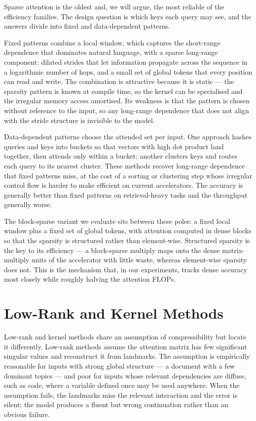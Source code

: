 \documentclass[11pt]{article}
\begin{document}
Sparse attention is the oldest and, we will argue, the most reliable of the efficiency families. The design question is which keys each query may see, and the answers divide into fixed and data-dependent patterns.

Fixed patterns combine a local window, which captures the short-range dependence that dominates natural language, with a sparse long-range component: dilated strides that let information propagate across the sequence in a logarithmic number of hops, and a small set of global tokens that every position can read and write. The combination is attractive because it is static --- the sparsity pattern is known at compile time, so the kernel can be specialised and the irregular memory access amortised. Its weakness is that the pattern is chosen without reference to the input, so any long-range dependence that does not align with the stride structure is invisible to the model.

Data-dependent patterns choose the attended set per input. One approach hashes queries and keys into buckets so that vectors with high dot product land together, then attends only within a bucket; another clusters keys and routes each query to its nearest cluster. These methods recover long-range dependence that fixed patterns miss, at the cost of a sorting or clustering step whose irregular control flow is harder to make efficient on current accelerators. The accuracy is generally better than fixed patterns on retrieval-heavy tasks and the throughput generally worse.

The block-sparse variant we evaluate sits between these poles: a fixed local window plus a fixed set of global tokens, with attention computed in dense blocks so that the sparsity is structured rather than element-wise. Structured sparsity is the key to its efficiency --- a block-sparse multiply maps onto the dense matrix-multiply units of the accelerator with little waste, whereas element-wise sparsity does not. This is the mechanism that, in our experiments, tracks dense accuracy most closely while roughly halving the attention FLOPs.

\section{Low-Rank and Kernel Methods}
\label{sec:lowrank}

Low-rank and kernel methods share an assumption of compressibility but locate it differently. Low-rank methods assume the attention matrix has few significant singular values and reconstruct it from landmarks. The assumption is empirically reasonable for inputs with strong global structure --- a document with a few dominant topics --- and poor for inputs whose relevant dependencies are diffuse, such as code, where a variable defined once may be used anywhere. When the assumption fails, the landmarks miss the relevant interaction and the error is silent: the model produces a fluent but wrong continuation rather than an obvious failure.
\end{document}
